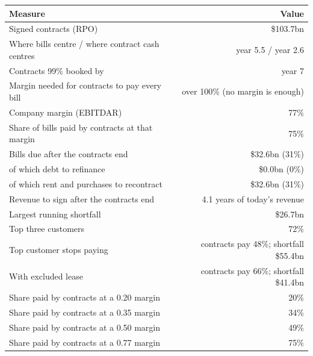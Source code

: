 \documentclass[11pt,a4paper]{article}
\begin{document}
\begin{center}\footnotesize\setlength{\tabcolsep}{3.5pt}\begin{tabular}{@{}lr@{}}\toprule
Measure & Value \\\midrule
Signed contracts (RPO) & \$103.7bn \\
Where bills centre / where contract cash centres & year 5.5 / year 2.6 \\
Contracts 99\% booked by & year 7 \\
Margin needed for contracts to pay every bill & over 100\% (no margin is enough) \\
Company margin (EBITDAR) & 77\% \\
Share of bills paid by contracts at that margin & 75\% \\
Bills due after the contracts end & \$32.6bn (31\%) \\
\quad of which debt to refinance & \$0.0bn (0\%) \\
\quad of which rent and purchases to recontract & \$32.6bn (31\%) \\
Revenue to sign after the contracts end & 4.1 years of today's revenue \\
Largest running shortfall & \$26.7bn \\
Top three customers & 72\% \\
Top customer stops paying & contracts pay 48\%; shortfall \$55.4bn \\
With excluded lease & contracts pay 66\%; shortfall \$41.4bn \\
Share paid by contracts at a 0.20 margin & 20\% \\
Share paid by contracts at a 0.35 margin & 34\% \\
Share paid by contracts at a 0.50 margin & 49\% \\
Share paid by contracts at a 0.77 margin & 75\% \\
\bottomrule\end{tabular}\end{center}
\end{document}
